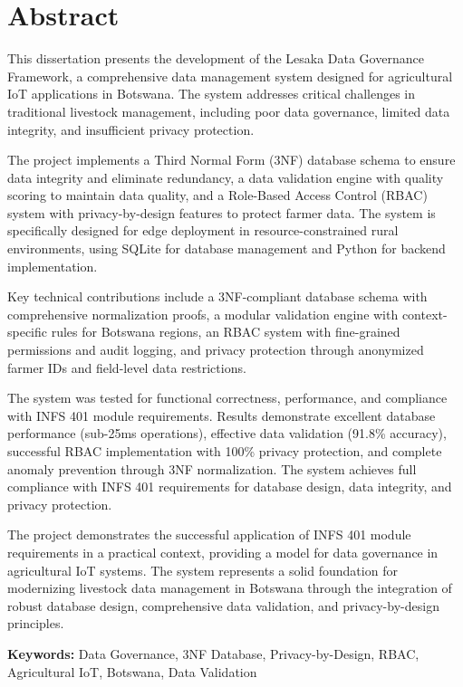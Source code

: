 
\chapter*{Abstract}

This dissertation presents the development of the Lesaka Data Governance Framework, a comprehensive data management system designed for agricultural IoT applications in Botswana. The system addresses critical challenges in traditional livestock management, including poor data governance, limited data integrity, and insufficient privacy protection.

The project implements a Third Normal Form (3NF) database schema to ensure data integrity and eliminate redundancy, a data validation engine with quality scoring to maintain data quality, and a Role-Based Access Control (RBAC) system with privacy-by-design features to protect farmer data. The system is specifically designed for edge deployment in resource-constrained rural environments, using SQLite for database management and Python for backend implementation.

Key technical contributions include a 3NF-compliant database schema with comprehensive normalization proofs, a modular validation engine with context-specific rules for Botswana regions, an RBAC system with fine-grained permissions and audit logging, and privacy protection through anonymized farmer IDs and field-level data restrictions.

The system was tested for functional correctness, performance, and compliance with INFS 401 module requirements. Results demonstrate excellent database performance (sub-25ms operations), effective data validation (91.8\% accuracy), successful RBAC implementation with 100\% privacy protection, and complete anomaly prevention through 3NF normalization. The system achieves full compliance with INFS 401 requirements for database design, data integrity, and privacy protection.

The project demonstrates the successful application of INFS 401 module requirements in a practical context, providing a model for data governance in agricultural IoT systems. The system represents a solid foundation for modernizing livestock data management in Botswana through the integration of robust database design, comprehensive data validation, and privacy-by-design principles.

\textbf{Keywords:} Data Governance, 3NF Database, Privacy-by-Design, RBAC, Agricultural IoT, Botswana, Data Validation
